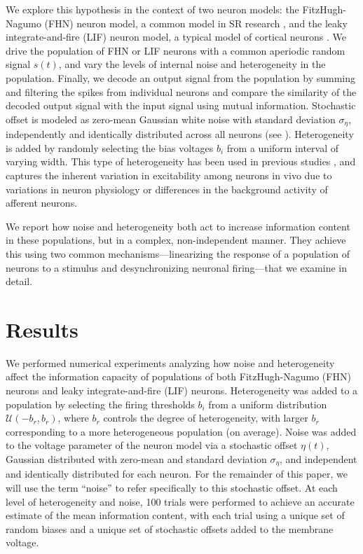 \documentclass[12pt]{article}
\begin{document}
We explore this hypothesis in the context of two neuron models:
the FitzHugh-Nagumo (FHN) neuron model,
a common model in SR research \citep{Wiesenfeld1994,Collins1995,Longtin1998,Stocks2001},
and the leaky integrate-and-fire (LIF) neuron model,
a typical model of cortical neurons \citep{Koch1999}.
We drive the population of FHN or LIF neurons
with a common aperiodic random signal $s(t)$,
and vary the levels of internal noise and heterogeneity in the population.
Finally, we decode an output signal from the population
by summing and filtering the spikes from individual neurons
and compare the similarity of the decoded output signal
with the input signal using mutual information.
Stochastic offset is modeled as zero-mean Gaussian white noise with standard deviation $\sigma_\eta$, independently and identically distributed across all neurons (see \textsc{}). Heterogeneity is added by randomly selecting
the bias voltages $b_i$ from a uniform interval of varying width.
This type of heterogeneity has been used in previous studies \citep[e.g.,][]{Brody2003},
and captures the inherent variation in excitability among neurons in vivo \citep{Mejias2012} due to variations in neuron physiology or differences in the background activity of afferent neurons.

We report how noise and heterogeneity both act to increase information content in these populations, but in a complex, non-independent manner. They achieve this using two common mechanisms---linearizing the response of a population of neurons to a stimulus and desynchronizing neuronal firing---that we examine in detail.

\section{Results}
\label{scn:results}

We performed numerical experiments analyzing how noise and heterogeneity affect the information capacity of populations of both FitzHugh-Nagumo (FHN) neurons and leaky integrate-and-fire (LIF) neurons. Heterogeneity was added to a population by selecting the firing thresholds ${b_i}$ from a uniform distribution $\mathcal{U}(-b_r, b_r)$, where $b_r$ controls the degree of heterogeneity, with larger $b_r$ corresponding to a more heterogeneous population (on average). Noise was added to the voltage parameter of the neuron model via a stochastic offset $\eta(t)$, Gaussian distributed with zero-mean and standard deviation $\sigma_\eta$, and independent and identically distributed for each neuron. For the remainder of this paper, we will use the term ``noise'' to refer specifically to this stochastic offset. At each level of heterogeneity and noise, 100 trials were performed to achieve an accurate estimate of the mean information content, with each trial using a unique set of random biases and a unique set of stochastic offsets added to the membrane voltage.
\end{document}
